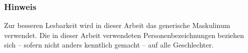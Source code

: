 \documentclass[a4paper,12pt]{scrreprt}
\begin{document}
\pagestyle{empty}



%

\pagestyle{fancy}

\tableofcontents
\newpage

\listoffigures
\newpage

\listoftables
\newpage

\printglossary[title={Abkürzungsverzeichnis}, type=\acronymtype]

\newpage
\thispagestyle{empty}
\mbox{}
\vfill
\subsubsection*{Hinweis}
Zur besseren Lesbarkeit wird in dieser Arbeit das generische Maskulinum verwendet. Die in dieser Arbeit verwendeten Personenbezeichnungen beziehen sich – sofern nicht anders kenntlich gemacht – auf alle Geschlechter.
\newpage















\pagestyle{plain}



\pagestyle{fancy}

\setcounter{biburllcpenalty}{7000}
\setcounter{biburlucpenalty}{8000}
\printbibliography[heading=bibintoc, title={Literatur}]


\end{document}
